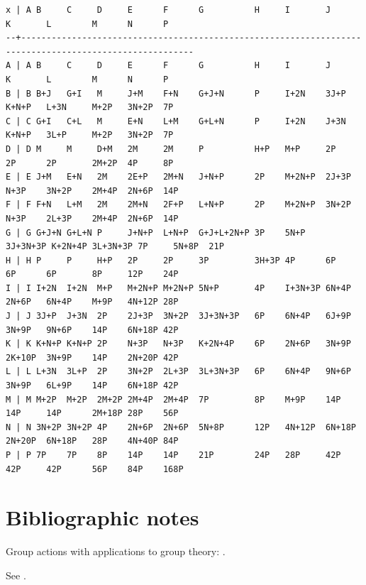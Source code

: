 \documentclass[11pt,oneside]{article}
\makeatletter
\newcommand{\verbatimfont}[1]{\renewcommand{\verbatim@font}{\ttfamily#1}}
\makeatother
\begin{document}
\verbatimfont{\scriptsize}%
\begin{verbatim}
x | A B     C     D     E      F      G          H     I       J        K       L        M      N      P    
--+--------------------------------------------------------------------------------------------------------
A | A B     C     D     E      F      G          H     I       J        K       L        M      N      P    
B | B B+J   G+I   M     J+M    F+N    G+J+N      P     I+2N    3J+P     K+N+P   L+3N     M+2P   3N+2P  7P   
C | C G+I   C+L   M     E+N    L+M    G+L+N      P     I+2N    J+3N     K+N+P   3L+P     M+2P   3N+2P  7P   
D | D M     M     D+M   2M     2M     P          H+P   M+P     2P       2P      2P       2M+2P  4P     8P   
E | E J+M   E+N   2M    2E+P   2M+N   J+N+P      2P    M+2N+P  2J+3P    N+3P    3N+2P    2M+4P  2N+6P  14P  
F | F F+N   L+M   2M    2M+N   2F+P   L+N+P      2P    M+2N+P  3N+2P    N+3P    2L+3P    2M+4P  2N+6P  14P  
G | G G+J+N G+L+N P     J+N+P  L+N+P  G+J+L+2N+P 3P    5N+P    3J+3N+3P K+2N+4P 3L+3N+3P 7P     5N+8P  21P  
H | H P     P     H+P   2P     2P     3P         3H+3P 4P      6P       6P      6P       8P     12P    24P  
I | I I+2N  I+2N  M+P   M+2N+P M+2N+P 5N+P       4P    I+3N+3P 6N+4P    2N+6P   6N+4P    M+9P   4N+12P 28P  
J | J 3J+P  J+3N  2P    2J+3P  3N+2P  3J+3N+3P   6P    6N+4P   6J+9P    3N+9P   9N+6P    14P    6N+18P 42P  
K | K K+N+P K+N+P 2P    N+3P   N+3P   K+2N+4P    6P    2N+6P   3N+9P    2K+10P  3N+9P    14P    2N+20P 42P  
L | L L+3N  3L+P  2P    3N+2P  2L+3P  3L+3N+3P   6P    6N+4P   9N+6P    3N+9P   6L+9P    14P    6N+18P 42P  
M | M M+2P  M+2P  2M+2P 2M+4P  2M+4P  7P         8P    M+9P    14P      14P     14P      2M+18P 28P    56P  
N | N 3N+2P 3N+2P 4P    2N+6P  2N+6P  5N+8P      12P   4N+12P  6N+18P   2N+20P  6N+18P   28P    4N+40P 84P  
P | P 7P    7P    8P    14P    14P    21P        24P   28P     42P      42P     42P      56P    84P    168P 
\end{verbatim}

\section{Bibliographic notes}

Group actions with applications to group theory: \cite{ConradGroup,ConradTransitive}.

See \cite{Dress1971}.


{}

\end{document}
